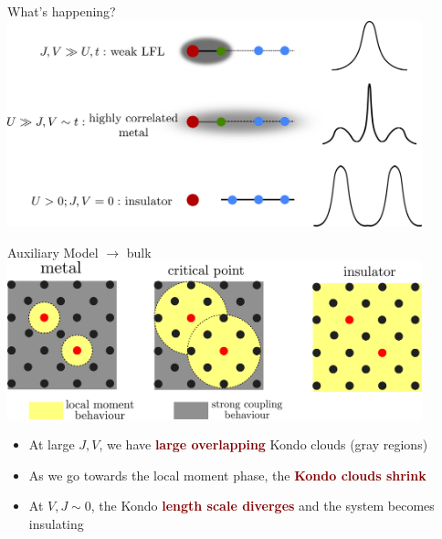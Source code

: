 \documentclass[aspectratio=169]{beamer}
\newcommand{\focus}[1]{\textcolor{maroon}{\textbf{#1}}}
\begin{document}
\begin{frame}[noframenumbering]{What's happening?}
\includegraphics[width=0.9\textwidth]{figures/sc-lm.pdf}
\end{frame}


\begin{frame}[noframenumbering]{Auxiliary Model $\rightarrow$ bulk}
\includegraphics[width=0.9\textwidth]{figures/cloud_lattice.pdf}

\begin{itemize}
	\item At large \(J,V\), we have \focus{large overlapping} Kondo clouds (gray regions)
	\item As we go towards the local moment phase, the \focus{Kondo clouds shrink}
	\item At \(V,J \sim 0\), the Kondo \focus{length scale diverges} and the system becomes insulating
\end{itemize}

\end{frame}
\end{document}
